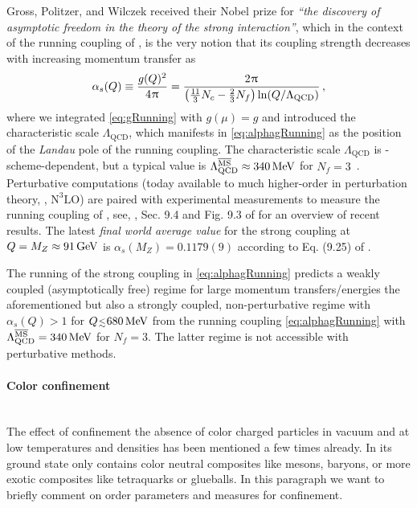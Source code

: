 Gross, Politzer, and Wilczek received their Nobel prize for \textit{``the discovery of asymptotic freedom in the theory of the strong interaction''}, which in the context of the running coupling of \qcd{}, is the very notion that its coupling strength decreases with increasing momentum transfer as 
\begin{align}
\alpha_s(Q)\equiv \frac{g(Q)^2}{4\piu} = \frac{2\piu}{\del{\frac{11}{3}N_c-\frac{2}{3}N_f}\ln(Q/\Lambda_\mathrm{QCD})}\, ,
\label{eq:alphagRunning}
\end{align}
where we integrated \cref{eq:gRunning} with $g(\mu)=g$ and introduced the characteristic scale $\Lambda_\mathrm{QCD}$, which manifests in \cref{eq:alphagRunning} as the position of the \textit{Landau} pole of the running coupling. 
The characteristic scale $\Lambda_\mathrm{QCD}$ is \rg{}-scheme-dependent, but a typical value is $\Lambda_\mathrm{QCD}^{\overline{\mathrm{MS}}}\approx 340\,\mathrm{MeV}$ for $N_f=3$~\cite{Deur:2016tte}.
Perturbative computations (today available to much higher-order in perturbation theory, \eg{}, $\mathrm{N}^3\mathrm{LO}$) are paired with experimental measurements to measure the running coupling of \qcd{}, see, \eg{}, Sec. 9.4 and Fig. 9.3 of  for an overview of recent results.
The latest \textit{final world average value} for the strong coupling at $Q=M_Z\approx 91\,\mathrm{GeV}$ is $\alpha_s(M_Z)={0.1179(9)}$ according to Eq. (9.25) of .

The running of the strong coupling in \cref{eq:alphagRunning} predicts a weakly coupled (asymptotically free) regime for large momentum transfers/energies \dash{} the aforementioned \qgp{} \dash{} but also a strongly coupled, non-perturbative regime with $\alpha_s(Q)>1$ for $Q\smallerlesssim 680\, \MeV$ from the running coupling \eqref{eq:alphagRunning} with $\Lambda_\mathrm{QCD}^{\overline{\mathrm{MS}}}= 340\,\mathrm{MeV}$ for $N_f=3$.
The latter regime is not accessible with perturbative methods.

\paragraph{Color confinement}\label{paragraph:qcdConf}\mbox{}\\%
The effect of confinement \dash{} the absence of color charged particles in vacuum and at low temperatures and densities \dash{} has been mentioned a few times already.
In its ground state \qcd{} only contains color neutral composites like mesons, baryons, or more exotic composites like tetraquarks or glueballs.
In this paragraph we want to briefly comment on order parameters and measures for confinement.

